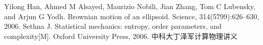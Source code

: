 \documentclass[UTF8]{ctexart}
\begin{document}
	
	
	\begin{thebibliography}{99}  
		Yilong Han, Ahmed M Alsayed, Maurizio Nobili, Jian Zhang, Tom C Lubensky, and Arjun G
		Yodh. Brownian motion of an ellipsoid. Science, 314(5799):626–630, 2006.
		Sethna J. Statistical mechanics: entropy, order parameters, and complexity[M]. Oxford University Press, 2006.
		中科大丁泽军计算物理讲义
	\end{thebibliography}
	
	
	
	
	\clearpage
\end{document}
